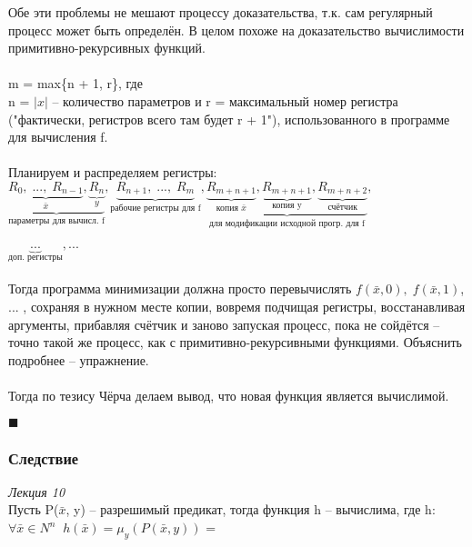 \documentclass{article}
\begin{document}
        Обе эти проблемы не мешают процессу доказательства, т.к. сам регулярный процесс может быть определён. В целом похоже на доказательство вычислимости примитивно-рекурсивных функций.\\
        \\m = max\{n + 1, r\}, где\\
        n = $|x|$ -- количество параметров и r = максимальный номер регистра ("фактически, регистров всего там будет r + 1"), использованного в программе для вычисления f.\\
        \\Планируем и распределяем регистры:\\
        $\underbrace{\underbrace{R_0, \; ... , \; R_{n - 1}}_{\bar x} , \underbrace{R_n}_{y}}_{\text{параметры для вычисл. f}}, \underbrace{R_{n + 1}, \; ... , \; R_m}_{\text{рабочие регистры для f}}, \underbrace{\underbrace{R_{m + n + 1}}_{\text{копия } \bar x}, \underbrace{R_{m + n + 1}}_{\text{копия y}}, \underbrace{R_{m + n + 2}}_{\text{счётчик}}}_{\text{для модификации исходной прогр. для f}},$\\
        \\$\underbrace{...}_{\text{доп. регистры}}, ...  $\\
        \\Тогда программа минимизации должна просто перевычислять $f(\bar x, 0), \; f(\bar x, 1)$, ... , сохраняя в нужном месте копии, вовремя подчищая регистры, восстанавливая аргументы, прибавляя счётчик и заново запуская процесс, пока не сойдётся -- точно такой же процесс, как с примитивно-рекурсивными функциями. Объяснить подробнее -- упражнение.\\
        \\Тогда по тезису Чёрча делаем вывод, что новая функция является вычислимой.
        \begin{flushright}
            $\blacksquare$\\
        \end{flushright}
        
        \subsubsection{Следствие}
        \emph{Лекция 10}\\
        
            Пусть P($\bar x$, y) -- разрешимый предикат, тогда функция h -- вычислима, где h:\\
            
            $\forall \bar x \in N^n \; \; h(\bar x) = \mu_y(P(\bar x, y))$ = \\
            
\end{document}
